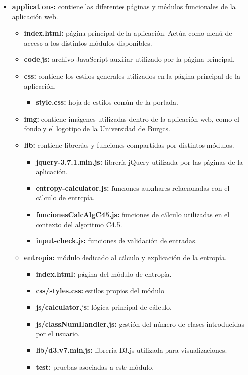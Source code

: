 \begin{itemize}
    \item \textbf{applications:} contiene las diferentes páginas y módulos funcionales de la aplicación web.
    \begin{itemize}
        \item \textbf{index.html:} página principal de la aplicación. Actúa como menú de acceso a los distintos módulos disponibles.

        \item \textbf{code.js:} archivo JavaScript auxiliar utilizado por la página principal.

        \item \textbf{css:} contiene los estilos generales utilizados en la página principal de la aplicación.
        \begin{itemize}
            \item \textbf{style.css:} hoja de estilos común de la portada.
        \end{itemize}

        \item \textbf{img:} contiene imágenes utilizadas dentro de la aplicación web, como el fondo y el logotipo de la Universidad de Burgos.

        \item \textbf{lib:} contiene librerías y funciones compartidas por distintos módulos.
        \begin{itemize}
            \item \textbf{jquery-3.7.1.min.js:} librería jQuery utilizada por las páginas de la aplicación.
            \item \textbf{entropy-calculator.js:} funciones auxiliares relacionadas con el cálculo de entropía.
            \item \textbf{funcionesCalcAlgC45.js:} funciones de cálculo utilizadas en el contexto del algoritmo C4.5.
            \item \textbf{input-check.js:} funciones de validación de entradas.
        \end{itemize}

        \item \textbf{entropia:} módulo dedicado al cálculo y explicación de la entropía.
        \begin{itemize}
            \item \textbf{index.html:} página del módulo de entropía.
            \item \textbf{css/styles.css:} estilos propios del módulo.
            \item \textbf{js/calculator.js:} lógica principal de cálculo.
            \item \textbf{js/classNumHandler.js:} gestión del número de clases introducidas por el usuario.
            \item \textbf{lib/d3.v7.min.js:} librería D3.js utilizada para visualizaciones.
            \item \textbf{test:} pruebas asociadas a este módulo.
        \end{itemize}


\end{itemize}
\end{itemize}
